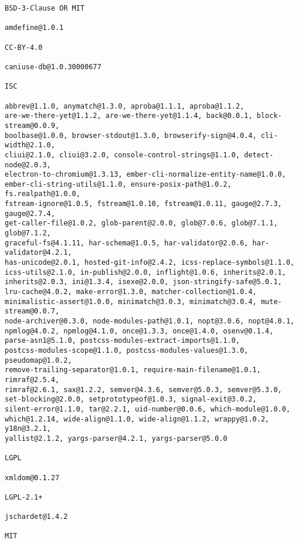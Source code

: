 \documentclass[a4paper]{article}
\begin{document}
\begin{verbatim}
BSD-3-Clause OR MIT

amdefine@1.0.1

CC-BY-4.0

caniuse-db@1.0.30000677

ISC

abbrev@1.1.0, anymatch@1.3.0, aproba@1.1.1, aproba@1.1.2,
are-we-there-yet@1.1.2, are-we-there-yet@1.1.4, back@0.0.1, block-stream@0.0.9,
boolbase@1.0.0, browser-stdout@1.3.0, browserify-sign@4.0.4, cli-width@2.1.0,
cliui@2.1.0, cliui@3.2.0, console-control-strings@1.1.0, detect-node@2.0.3,
electron-to-chromium@1.3.13, ember-cli-normalize-entity-name@1.0.0,
ember-cli-string-utils@1.1.0, ensure-posix-path@1.0.2, fs.realpath@1.0.0,
fstream-ignore@1.0.5, fstream@1.0.10, fstream@1.0.11, gauge@2.7.3, gauge@2.7.4,
get-caller-file@1.0.2, glob-parent@2.0.0, glob@7.0.6, glob@7.1.1, glob@7.1.2,
graceful-fs@4.1.11, har-schema@1.0.5, har-validator@2.0.6, har-validator@4.2.1,
has-unicode@2.0.1, hosted-git-info@2.4.2, icss-replace-symbols@1.1.0,
icss-utils@2.1.0, in-publish@2.0.0, inflight@1.0.6, inherits@2.0.1,
inherits@2.0.3, ini@1.3.4, isexe@2.0.0, json-stringify-safe@5.0.1,
lru-cache@4.0.2, make-error@1.3.0, matcher-collection@1.0.4,
minimalistic-assert@1.0.0, minimatch@3.0.3, minimatch@3.0.4, mute-stream@0.0.7,
node-archiver@0.3.0, node-modules-path@1.0.1, nopt@3.0.6, nopt@4.0.1,
npmlog@4.0.2, npmlog@4.1.0, once@1.3.3, once@1.4.0, osenv@0.1.4,
parse-asn1@5.1.0, postcss-modules-extract-imports@1.1.0,
postcss-modules-scope@1.1.0, postcss-modules-values@1.3.0, pseudomap@1.0.2,
remove-trailing-separator@1.0.1, require-main-filename@1.0.1, rimraf@2.5.4,
rimraf@2.6.1, sax@1.2.2, semver@4.3.6, semver@5.0.3, semver@5.3.0,
set-blocking@2.0.0, setprototypeof@1.0.3, signal-exit@3.0.2,
silent-error@1.1.0, tar@2.2.1, uid-number@0.0.6, which-module@1.0.0,
which@1.2.14, wide-align@1.1.0, wide-align@1.1.2, wrappy@1.0.2, y18n@3.2.1,
yallist@2.1.2, yargs-parser@4.2.1, yargs-parser@5.0.0

LGPL

xmldom@0.1.27

LGPL-2.1+

jschardet@1.4.2

MIT


\end{verbatim}
\end{document}

